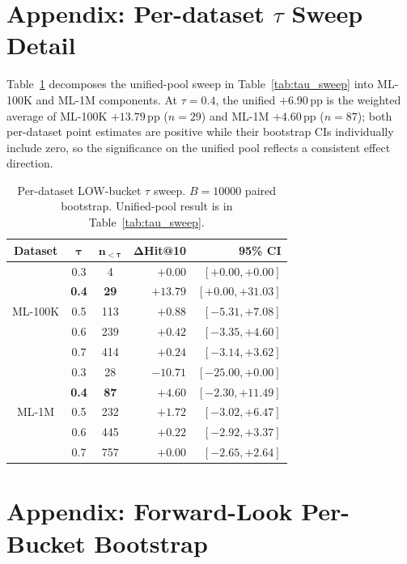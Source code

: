 \documentclass[11pt]{article}
\begin{document}
\section{Appendix: Per-dataset \texorpdfstring{$\tau$}{tau} Sweep Detail}
\label{app:tau_sweep}

Table~\ref{tab:tau_sweep_per_ds} decomposes the unified-pool sweep
in Table~\ref{tab:tau_sweep} into ML-100K and ML-1M components. At
$\tau{=}0.4$, the unified $+6.90$\,pp is the weighted average of
ML-100K $+13.79$\,pp ($n{=}29$) and ML-1M $+4.60$\,pp ($n{=}87$);
both per-dataset point estimates are positive while their bootstrap
CIs individually include zero, so the significance on the unified
pool reflects a consistent effect direction.

\begin{table}[h]
\centering
\small
\setlength{\tabcolsep}{5pt}
\begin{tabular}{cccrr}
\toprule
\textbf{Dataset} & $\boldsymbol{\tau}$ & $\mathbf{n_{<\tau}}$ & $\mathbf{\Delta}$Hit@10 & \textbf{95\% CI} \\
\midrule
\multirow{5}{*}{ML-100K}
  & 0.3 &   4 & $+0.00$  & $[+0.00,+0.00]$  \\
  & \textbf{0.4} & \textbf{29} & $\mathbf{+13.79}$ & $\mathbf{[+0.00,+31.03]}$ \\
  & 0.5 & 113 & $+0.88$  & $[-5.31,+7.08]$  \\
  & 0.6 & 239 & $+0.42$  & $[-3.35,+4.60]$  \\
  & 0.7 & 414 & $+0.24$  & $[-3.14,+3.62]$  \\
\midrule
\multirow{5}{*}{ML-1M}
  & 0.3 &  28 & $-10.71$ & $[-25.00,+0.00]$ \\
  & \textbf{0.4} & \textbf{87} & $\mathbf{+4.60}$ & $\mathbf{[-2.30,+11.49]}$ \\
  & 0.5 & 232 & $+1.72$  & $[-3.02,+6.47]$  \\
  & 0.6 & 445 & $+0.22$  & $[-2.92,+3.37]$  \\
  & 0.7 & 757 & $+0.00$  & $[-2.65,+2.64]$  \\
\bottomrule
\end{tabular}
\caption{Per-dataset LOW-bucket $\tau$ sweep. $B{=}10000$ paired
bootstrap. Unified-pool result is in Table~\ref{tab:tau_sweep}.}
\label{tab:tau_sweep_per_ds}
\end{table}

\section{Appendix: Forward-Look Per-Bucket Bootstrap}
\label{app:fwd_bucket}
\end{document}
